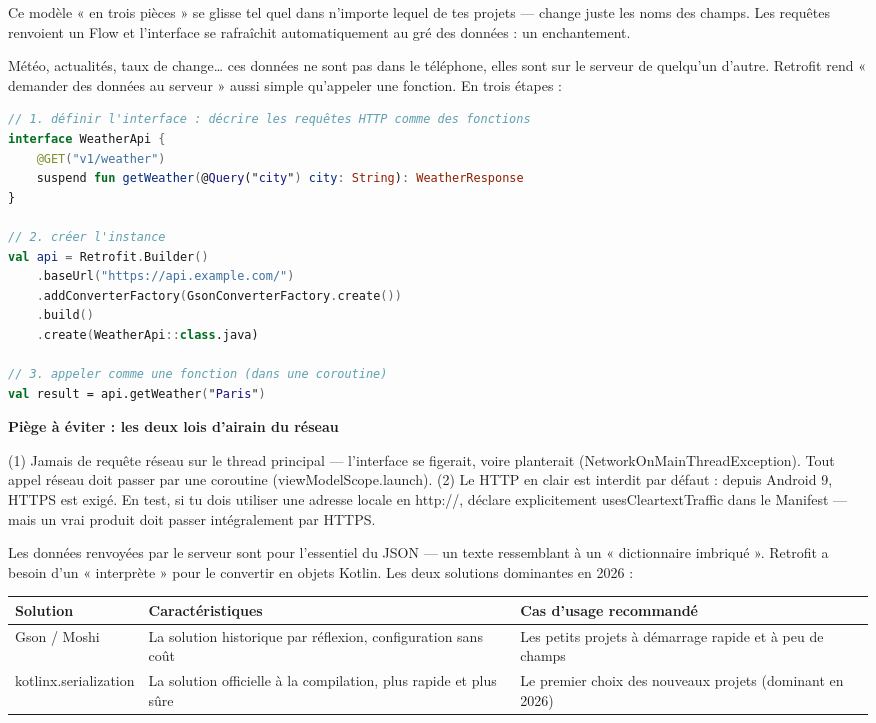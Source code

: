 Ce modèle « en trois pièces » se glisse tel quel dans n'importe lequel de tes projets — change juste les noms des champs. Les requêtes renvoient un Flow et l'interface se rafraîchit automatiquement au gré des données : un enchantement.


Météo, actualités, taux de change… ces données ne sont pas dans le téléphone, elles sont sur le serveur de quelqu'un d'autre. Retrofit rend « demander des données au serveur » aussi simple qu'appeler une fonction. En trois étapes :

\begin{lstlisting}[language=Kotlin]
// 1. définir l'interface : décrire les requêtes HTTP comme des fonctions
interface WeatherApi {
    @GET("v1/weather")
    suspend fun getWeather(@Query("city") city: String): WeatherResponse
}

// 2. créer l'instance
val api = Retrofit.Builder()
    .baseUrl("https://api.example.com/")
    .addConverterFactory(GsonConverterFactory.create())
    .build()
    .create(WeatherApi::class.java)

// 3. appeler comme une fonction (dans une coroutine)
val result = api.getWeather("Paris")
\end{lstlisting}

\textbf{Piège à éviter : les deux lois d'airain du réseau}\par

(1) Jamais de requête réseau sur le thread principal — l'interface se figerait, voire planterait (NetworkOnMainThreadException). Tout appel réseau doit passer par une coroutine (viewModelScope.launch). (2) Le HTTP en clair est interdit par défaut : depuis Android 9, HTTPS est exigé. En test, si tu dois utiliser une adresse locale en http://, déclare explicitement usesCleartextTraffic dans le Manifest — mais un vrai produit doit passer intégralement par HTTPS.


Les données renvoyées par le serveur sont pour l'essentiel du JSON — un texte ressemblant à un « dictionnaire imbriqué ». Retrofit a besoin d'un « interprète » pour le convertir en objets Kotlin. Les deux solutions dominantes en 2026 :

\begin{center}
\begin{tabularx}{\linewidth}{|X|X|X|}
\hline
\textbf{Solution} & \textbf{Caractéristiques} & \textbf{Cas d'usage recommandé} \tabularnewline
\hline
Gson / Moshi & La solution historique par réflexion, configuration sans coût & Les petits projets à démarrage rapide et à peu de champs \tabularnewline
kotlinx.serialization & La solution officielle à la compilation, plus rapide et plus sûre & Le premier choix des nouveaux projets (dominant en 2026) \tabularnewline
\hline
\end{tabularx}
\end{center}

